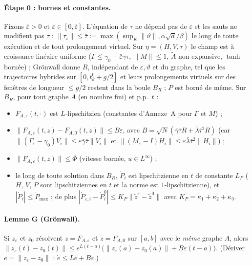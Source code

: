 \documentclass[11pt,a4paper]{article}
\theoremstyle{remark}
\theoremstyle{definition}
\newcommand{\norm}[1]{\lVert #1\rVert}
\newcommand{\eps}{\varepsilon}
\newcommand{\vth}{\vartheta}
\newcommand{\zt}{\widetilde z}
\begin{document}
\paragraph{Étape 0 : bornes et constantes.} Fixons $\bar\eps>0$ et $\eps\in[0,\bar\eps]$. L'équation de $\tau$ ne dépend pas de $\eps$ et les sauts ne modifient pas $\tau$ : $\norm{\tau_i}\le\bar\tau:=\max(\sup_K\norm\vth,\alpha\sqrt d/\beta)$ le long de toute exécution et de tout prolongement virtuel. Sur $\eta=(H,V,\tau)$ le champ est à croissance linéaire uniforme ($\Gamma\le\gamma_0+\bar\eps\bar\gamma\bar\tau$, $\norm M\le1$, $\tilde A$ non expansive, $\tanh$ bornée) ; Grönwall donne $R$, indépendant de $\eps,\vth$ et du graphe, tel que les trajectoires hybrides sur $[0,t_k^0+g/2]$ et leurs prolongements virtuels sur des fenêtres de longueur $\le g/2$ restent dans la boule $B_R$ ; $P$ est borné de même. Sur $B_R$, pour tout graphe $A$ (en nombre fini) et p.p.\ $t$ :
\begin{itemize}[nosep]
\item $F_{A,\eps}(t,\cdot)$ est $L$-lipschitzien (constantes d'Annexe~A pour $\Gamma$ et $M$) ;
\item $\norm{F_{A,\eps}(t,z)-F_{A,0}(t,z)}\le B\eps$, avec $B=\sqrt N(\bar\gamma\bar\tau R+\bar\lambda\bar\tau^2R)$ (car $\norm{(\Gamma_\eps-\gamma_0)V_i}\le\eps\bar\gamma\bar\tau\norm{V_i}$ et $\norm{(M_\eps-I)H_i}\le\eps\bar\lambda\bar\tau^2\norm{H_i}$) ;
\item $\norm{F_{A,\eps}(t,z)}\le\bar\Phi$ (vitesse bornée, $u\in L^\infty$) ;
\item le long de toute solution dans $B_R$, $\dot P_i$ est lipschitzienne en $t$ de constante $L_P$ ($H$, $V$, $P$ sont lipschitziennes en $t$ et la norme est $1$-lipschitzienne), et $|\dot P_i|\le\dot P_{\max}$ ; de plus $|\dot P_{\eps,i}-\dot P^0_i|\le K_P\norm{\zt^\eps-\zt^0}$ avec $K_P=\kappa_1+\kappa_2+\kappa_3$.
\end{itemize}

\paragraph{Lemme G (Grönwall).} Si $z_\eps$ et $z_0$ résolvent $\dot z=F_{A,\eps}$ et $\dot z=F_{A,0}$ sur $[a,b]$ avec le \emph{même} graphe $A$, alors $\norm{z_\eps(t)-z_0(t)}\le e^{L(t-a)}\bigl(\norm{z_\eps(a)-z_0(a)}+B\eps(t-a)\bigr)$. (Dériver $e=\norm{z_\eps-z_0}$ : $\dot e\le Le+B\eps$.)
\end{document}
